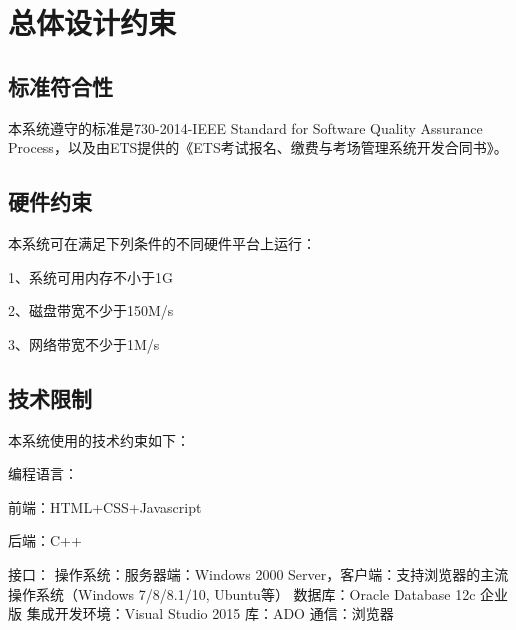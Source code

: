 \chapter{总体设计约束}
 
\section{标准符合性}
本系统遵守的标准是730-2014-IEEE Standard for Software Quality Assurance Process，以及由ETS提供的《ETS考试报名、缴费与考场管理系统开发合同书》。

\section{硬件约束}
本系统可在满足下列条件的不同硬件平台上运行：

1、系统可用内存不小于1G

2、磁盘带宽不少于150M/s

3、网络带宽不少于1M/s


\section{技术限制}
本系统使用的技术约束如下：

编程语言：

	前端：HTML+CSS+Javascript

	后端：C++

接口：
	操作系统：服务器端：Windows 2000 Server，客户端：支持浏览器的主流操作系统（Windows 7/8/8.1/10, Ubuntu等）
	数据库：Oracle Database 12c 企业版
	集成开发环境：Visual Studio 2015
	库：ADO
	通信：浏览器
